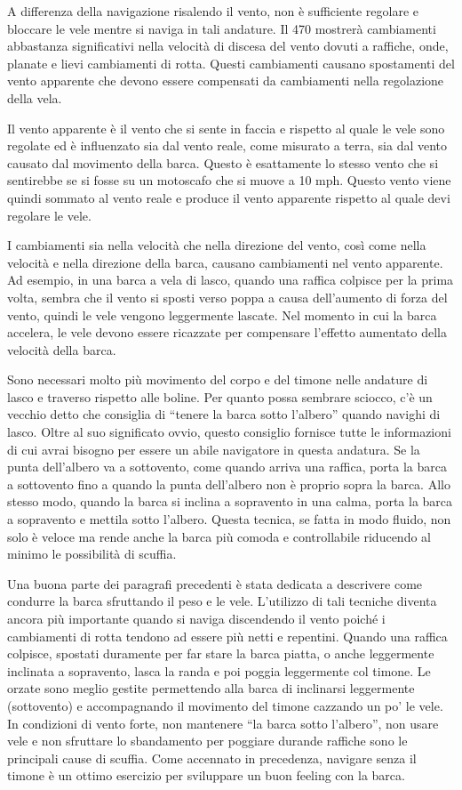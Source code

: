 A differenza della navigazione risalendo il vento, non è sufficiente regolare e
bloccare le vele mentre si naviga in tali andature. Il 470 mostrerà cambiamenti
abbastanza significativi nella velocità di discesa del vento dovuti a raffiche,
onde, planate e lievi cambiamenti di rotta. Questi cambiamenti causano
spostamenti del vento apparente che devono essere compensati da cambiamenti
nella regolazione della vela.

Il vento apparente è il vento che si sente in faccia e rispetto al quale le vele
sono regolate ed è influenzato sia dal vento reale, come misurato a terra, sia
dal vento causato dal movimento della barca. Questo è esattamente lo stesso
vento che si sentirebbe se si fosse su un motoscafo che si muove a 10 mph.
Questo vento viene quindi sommato al vento reale e produce il vento apparente
rispetto al quale devi regolare le vele.

I cambiamenti sia nella velocità che nella direzione del vento, così come nella
velocità e nella direzione della barca, causano cambiamenti nel vento apparente.
Ad esempio, in una barca a vela di lasco, quando una raffica colpisce per la
prima volta, sembra che il vento si sposti verso poppa a causa dell'aumento di
forza del vento, quindi le vele vengono leggermente lascate. Nel momento in cui
la barca accelera, le vele devono essere ricazzate per compensare l'effetto
aumentato della velocità della barca.

Sono necessari molto più movimento del corpo e del timone nelle andature di
lasco e traverso rispetto alle boline. Per quanto possa sembrare sciocco, c'è un
vecchio detto che consiglia di ``tenere la barca sotto l'albero'' quando navighi
di lasco. Oltre al suo significato ovvio, questo consiglio fornisce tutte le
informazioni di cui avrai bisogno per essere un abile navigatore in questa
andatura. Se la punta dell'albero va a sottovento, come quando arriva una
raffica, porta la barca a sottovento fino a quando la punta dell'albero non è
proprio sopra la barca. Allo stesso modo, quando la barca si inclina a
sopravento in una calma, porta la barca a sopravento e mettila sotto l'albero.
Questa tecnica, se fatta in modo fluido, non solo è veloce ma rende anche la
barca più comoda e controllabile riducendo al minimo le possibilità di scuffia.

Una buona parte dei paragrafi precedenti è stata dedicata a descrivere come
condurre la barca sfruttando il peso e le vele. L'utilizzo di tali tecniche
diventa ancora più importante quando si naviga discendendo il vento poiché i
cambiamenti di rotta tendono ad essere più netti e repentini. Quando una raffica
colpisce, spostati duramente per far stare la barca piatta, o anche leggermente
inclinata a sopravento, lasca la randa e poi poggia leggermente col timone. Le
orzate sono meglio gestite permettendo alla barca di inclinarsi leggermente
(sottovento) e accompagnando il movimento del timone cazzando un po' le vele. In
condizioni di vento forte, non mantenere ``la barca sotto l'albero'', non usare
vele e non sfruttare lo sbandamento per poggiare durande raffiche sono le
principali cause di scuffia. Come accennato in precedenza, navigare senza il
timone è un ottimo esercizio per sviluppare un buon feeling con la barca.

